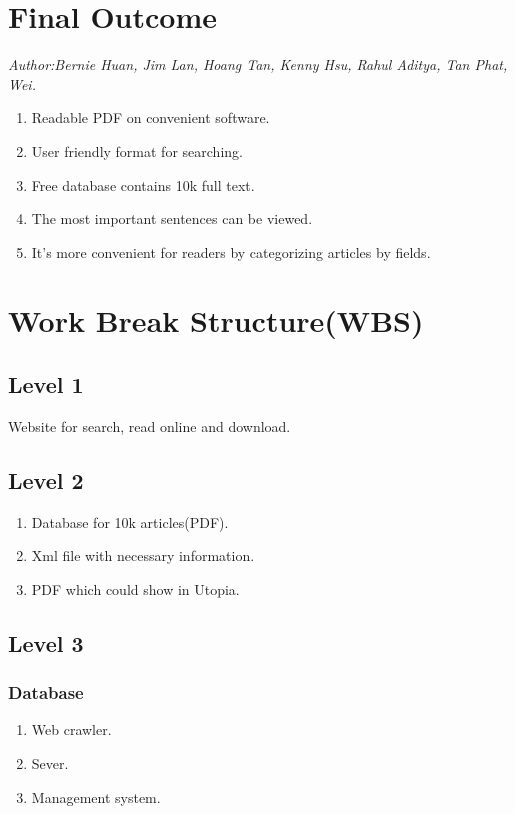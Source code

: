 
\section{Final Outcome}
\textit{\footnotesize Author:Bernie Huan, Jim Lan, Hoang Tan, Kenny Hsu, Rahul Aditya, Tan Phat, Wei.}\\
	\begin{enumerate}
		\item Readable PDF on convenient software.
		\item User friendly format for searching.
		\item Free database contains 10k full text.
		\item The most important sentences can be viewed.
		\item It’s more convenient for readers by categorizing articles by fields.
	\end{enumerate}
	
\section{Work Break Structure(WBS)}
	\subsection*{Level 1}
	Website for search, read online and download.
	\subsection*{Level 2}
		\begin{enumerate}
			\item Database for 10k articles(PDF).
			\item Xml file with necessary  information.
			\item PDF which could show in Utopia.
		\end{enumerate}	
	\subsection*{Level 3}	
		\subsubsection*{Database}
			\begin{enumerate}
				\item Web crawler.
				\item Sever.
				\item Management system.
			\end{enumerate}	
